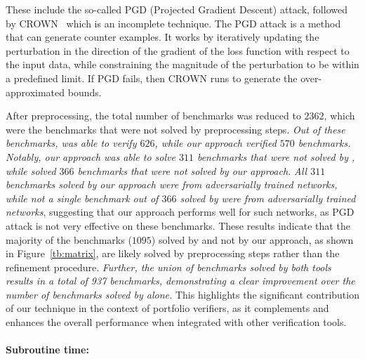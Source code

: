 These include the so-called PGD (Projected Gradient Descent) attack, followed by CROWN~\cite{zhang2018efficient} which is an incomplete technique. The PGD attack is a method that can generate counter examples. It works by iteratively updating the  perturbation in the direction of the gradient of the loss function with respect to the input data,  while constraining the magnitude of the perturbation to be within a predefined limit. If PGD fails, then CROWN runs to generate the over-approximated bounds. %

After preprocessing, the total number of benchmarks was reduced to $2362$, which were the benchmarks that were not 
solved by preprocessing steps. \textit{Out of these benchmarks, \alphabeta{} was able to verify $626$, 
while our approach verified 
$570$ benchmarks. Notably, our approach was able to solve $311$ benchmarks that were not solved by \alphabeta{}, 
while \alphabeta{} solved $366$ benchmarks that were not solved by our approach. }
\textit{All $311$ benchmarks solved by our approach were from adversarially trained networks, while 
not a single benchmark out of $366$ solved by \alphabeta{} were from adversarially trained networks}, 
suggesting that our approach performs 
well for such networks, as PGD attack is not very effective on these benchmarks. 
These results indicate that the majority of the benchmarks ($1095$) solved by \alphabeta{} and not by our approach, 
as shown in Figure~\ref{tb:matrix}, are likely solved by preprocessing steps rather than the refinement procedure.
\textit{Further, the union of benchmarks solved by both tools results in a total of 937 benchmarks, demonstrating a clear improvement over the number of benchmarks solved by \alphabeta{} alone.}
This highlights the significant contribution of our technique in the context of portfolio verifiers, 
as it complements and enhances the overall performance when integrated with other verification tools.


\paragraph{Subroutine time: }



